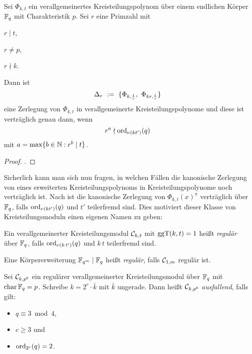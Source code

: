 \begin{satz}
  \label{satz:zerlegungssatz}
  Sei $\Phi_{k,t}$ ein verallgemeinertes Kreisteilungspolynom über einem
  endlichen Körper $\mathbb{F}_q$ mit Charakteristik $p$. Sei $r$ eine Primzahl
  mit

  \begin{itemize*}[itemjoin={\qquad}]
    \item $r \mid t$,
    \item $r \neq p$,
    \item $r \nmid k$.
  \end{itemize*}

  Dann ist 
  \[ \Delta_r \ :=\  \{ \Phi_{k,\frac{t}{r}},\ \Phi_{kr, \frac{t}{r}}\}\]
  eine Zerlegung von $\Phi_{k,t}$ in verallgemeinerte Kreisteilungspolynome und
  diese ist verträglich genau dann, wenn
  \[ r^a \nmid \operatorname{ord}_{\nu(kt')}(q) \]
  mit $a = \max\{ b\in \mathbb{N}: r^b \mid t\}$.
\end{satz}
\begin{proof}
  \autocite[Decomposition Theorem, Section 19]{hachenberger1997finite}.
\end{proof}


Sicherlich kann man sich nun fragen, in welchen Fällen die kanonische Zerlegung
von eines erweiterten Kreisteilungspolynoms in Kreisteilungspolynome noch
verträglich ist. Nach \autocite[Theorem 19.10]{hachenberger1997finite} 
ist die kanonische Zerlegung von $\Phi_{k,t}(x)^\pi$ verträglich über 
$\mathbb{F}_q$, falls $\operatorname{ord}_{\nu(kt')}(q)$ und $t'$ teilerfremd sind. Dies motiviert
dieser Klasse von Kreisteilungsmoduln einen eigenen Namen zu geben:

\begin{definition}[regulär]
  \label{def:regulaer}
  Ein verallgemeinerter Kreisteilungsmodul $\mathcal{C}_{k,t}$ 
  mit $\operatorname{ggT}(k,t)=1$ heißt \emph{regulär} über $\mathbb{F}_q$,
  falls $\operatorname{ord}_{\nu(k\,t')}(q)$ und $k\,t$ teilerfremd sind.

  Eine Körpererweiterung $\mathbb{F}_{q^m} \mid \mathbb{F}_q$ heißt \emph{regulär}, falls
  $\mathcal{C}_{1,m}$ regulär ist.
\end{definition}


\begin{definition}[ausfallend]
  \label{def:ausfallend}
  Sei $\mathcal{C}_{k, p^b}$ ein regulärer verallgemeinerter Kreisteilungsmodul 
  über $\mathbb{F}_q$ mit $\operatorname{char} \mathbb{F}_q = p$. Schreibe $k = 2^c \cdot \bar k$ mit $\bar
  k$ ungerade. Dann heißt $\mathcal{C}_{k,p^b}$ \emph{ausfallend}, falls gilt:
  \begin{itemize}
    \item $q \equiv 3 \bmod 4$,
    \item $c \geq 3$ und 
    \item $\operatorname{ord}_{2^c}(q) = 2$.
  \end{itemize}
\end{definition}


